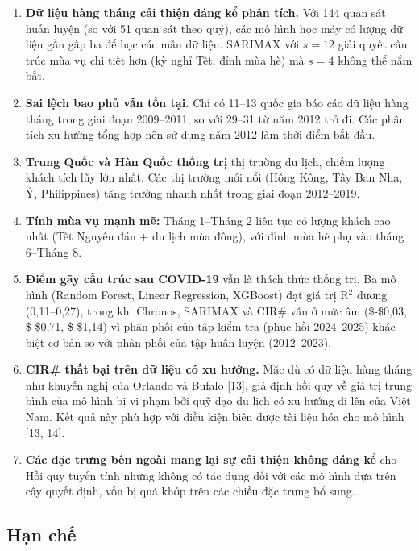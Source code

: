 \documentclass[
]{article}
\begin{document}
\begin{enumerate}
\def\labelenumi{\arabic{enumi}.}
\item
  \textbf{Dữ liệu hàng tháng cải thiện đáng kể phân tích.} Với 144 quan
  sát huấn luyện (so với 51 quan sát theo quý), các mô hình học máy có
  lượng dữ liệu gần gấp ba để học các mẫu dữ liệu. SARIMAX với
  \(s = 12\) giải quyết cấu trúc mùa vụ chi tiết hơn (kỳ nghỉ Tết, đỉnh
  mùa hè) mà \(s = 4\) không thể nắm bắt.
\item
  \textbf{Sai lệch bao phủ vẫn tồn tại.} Chỉ có 11--13 quốc gia báo cáo
  dữ liệu hàng tháng trong giai đoạn 2009--2011, so với 29--31 từ năm
  2012 trở đi. Các phân tích xu hướng tổng hợp nên sử dụng năm 2012 làm
  thời điểm bắt đầu.
\item
  \textbf{Trung Quốc và Hàn Quốc thống trị} thị trường du lịch, chiếm
  lượng khách tích lũy lớn nhất. Các thị trường mới nổi (Hồng Kông, Tây
  Ban Nha, Ý, Philippines) tăng trưởng nhanh nhất trong giai đoạn
  2012--2019.
\item
  \textbf{Tính mùa vụ mạnh mẽ:} Tháng 1--Tháng 2 liên tục có lượng khách
  cao nhất (Tết Nguyên đán + du lịch mùa đông), với đỉnh mùa hè phụ vào
  tháng 6--Tháng 8.
\item
  \textbf{Điểm gãy cấu trúc sau COVID-19} vẫn là thách thức thống trị.
  Ba mô hình (Random Forest, Linear Regression, XGBoost) đạt giá trị
  R\(^2\) dương (0,11--0,27), trong khi Chronos, SARIMAX và CIR\# vẫn ở
  mức âm (\$-\$0,03, \$-\$0,71, \$-\$1,14) vì phân phối của tập kiểm tra
  (phục hồi 2024--2025) khác biệt cơ bản so với phân phối của tập huấn
  luyện (2012--2023).
\item
  \textbf{CIR\# thất bại trên dữ liệu có xu hướng.} Mặc dù có dữ liệu
  hàng tháng như khuyến nghị của Orlando và Bufalo {[}13{]}, giả định
  hồi quy về giá trị trung bình của mô hình bị vi phạm bởi quỹ đạo du
  lịch có xu hướng đi lên của Việt Nam. Kết quả này phù hợp với điều
  kiện biên được tài liệu hóa cho mô hình {[}13, 14{]}.
\item
  \textbf{Các đặc trưng bên ngoài mang lại sự cải thiện không đáng kể}
  cho Hồi quy tuyến tính nhưng không có tác dụng đối với các mô hình dựa
  trên cây quyết định, vốn bị quá khớp trên các chiều đặc trưng bổ sung.
\end{enumerate}

\subsection{Hạn chế}\label{hux1ea1n-chux1ebf}
\end{document}
